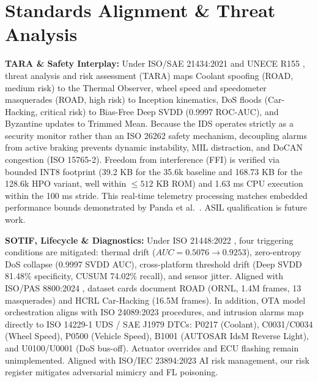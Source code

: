 \documentclass[conference]{IEEEtran}
\begin{document}
\section{Standards Alignment \& Threat Analysis}

\textbf{TARA \& Safety Interplay:} Under ISO/SAE 21434:2021 \cite{iso21434} and UNECE R155 \cite{unece155}, threat analysis and risk assessment (TARA) maps Coolant spoofing (ROAD, medium risk) to the Thermal Observer, wheel speed and speedometer masquerades (ROAD, high risk) to Inception kinematics, DoS floods (Car-Hacking, critical risk) to Bias-Free Deep SVDD (0.9997 ROC-AUC), and Byzantine updates to Trimmed Mean. Because the IDS operates strictly as a security monitor rather than an ISO 26262 \cite{iso26262} safety mechanism, decoupling alarms from active braking prevents dynamic instability, MIL distraction, and DoCAN congestion (ISO 15765-2). Freedom from interference (FFI) is verified via bounded INT8 footprint (39.2 KB for the 35.6k baseline and 168.73 KB for the 128.6k HPO variant, well within $\le 512$ KB ROM) and 1.63 ms CPU execution within the 100 ms stride. This real-time telemetry processing matches embedded performance bounds demonstrated by Panda et al.\ \cite{panda2017embedded}. ASIL qualification is future work.

\textbf{SOTIF, Lifecycle \& Diagnostics:} Under ISO 21448:2022 \cite{iso21448}, four triggering conditions are mitigated: thermal drift ($AUC = 0.5076 \rightarrow 0.9253$), zero-entropy DoS collapse (0.9997 SVDD AUC), cross-platform threshold drift (Deep SVDD 81.48\% specificity, CUSUM 74.02\% recall), and sensor jitter. Aligned with ISO/PAS 8800:2024 \cite{isopas8800}, dataset cards document ROAD (ORNL, 1.4M frames, 13 masquerades) and HCRL Car-Hacking (16.5M frames). In addition, OTA model orchestration aligns with ISO 24089:2023 procedures, and intrusion alarms map directly to ISO 14229-1 UDS / SAE J1979 DTCs: P0217 (Coolant), C0031/C0034 (Wheel Speed), P0500 (Vehicle Speed), B1001 (AUTOSAR IdsM Reverse Light), and U0100/U0001 (DoS bus-off). Actuator overrides and ECU flashing remain unimplemented. Aligned with ISO/IEC 23894:2023 AI risk management, our risk register mitigates adversarial mimicry and FL poisoning.

\end{document}
